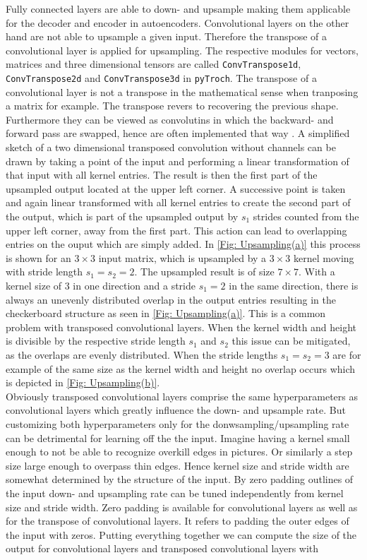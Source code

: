 Fully connected layers are able to down- and upsample making them applicable for the decoder and encoder in autoencoders. Convolutional layers on the other hand are not able to upsample a given input. Therefore the transpose of a convolutional layer is applied for upsampling. The respective modules for vectors, matrices and three dimensional tensors are called \texttt{ConvTranspose1d}, \texttt{ConvTranspose2d} and \texttt{ConvTranspose3d} in \texttt{pyTroch}. The transpose of a convolutional layer is not a transpose in the mathematical sense when tranposing a matrix for example. The transpose revers to recovering the previous shape. Furthermore they can be viewed as convolutins in which the backward- and forward pass are swapped, hence are often implemented that way \cite{Goodfellow} \cite{lane_2018} \cite{divyanshu_2020}. A simplified sketch of a two dimensional transposed convolution without channels can be drawn by taking a point of the input and performing a linear transformation of that input with all kernel entries. The result is then the first part of the upsampled output located at the upper left corner. A successive point is taken and again linear transformed with all kernel entries to create the second part of the output, which is part of the upsampled output by $s_1$ strides counted from the upper left corner, away from the first part. This action can lead to overlapping entries on the ouput which are simply added. In \cref{Fig: Upsampling(a)} this process is shown for an $3 \times 3$ input matrix, which is upsampled by a $3\times 3$ kernel moving with stride length $s_1=s_2=2$. The upsampled result is of size $7 \times 7$. With a kernel size of 3 in one direction and a stride $s_1=2$ in the same direction, there is always an unevenly distributed overlap in the output entries resulting in the checkerboard structure as seen in \cref{Fig: Upsampling(a)}. This is a common problem with transposed convolutional layers. When the kernel width and height is divisible by the respective stride length $s_1$ and $s_2$ this issue can be mitigated, as the overlaps are evenly distributed. When the stride lengths $s_1=s_2=3$ are for example of the same size as the kernel width and height no overlap occurs which is depicted in \cref{Fig: Upsampling(b)}.\\
Obviously transposed convolutional layers comprise the same hyperparameters as convolutional layers which greatly influence the down- and upsample rate. But customizing both hyperparameters only for the donwsampling/upsampling rate can be detrimental for learning off the the input. Imagine having a kernel small enough to not be able to recognize overkill edges in pictures. Or similarly a step size large enough to overpass thin edges. Hence kernel size and stride width are somewhat determined by the structure of the input. By zero padding outlines of the input down- and upsampling rate can be tuned independently from kernel size and stride width. Zero padding is available for convolutional layers as well as for the transpose of convolutional layers. It refers to padding the outer edges of the input with zeros. Putting everything together we can compute the size of the output for convolutional layers and transposed convolutional layers with\\\\
